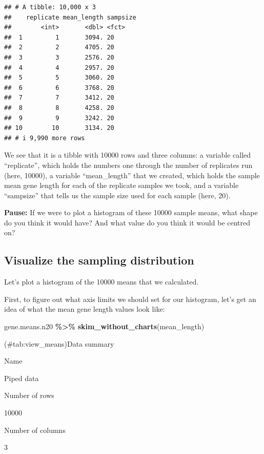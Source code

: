 \documentclass[
]{book}
\newenvironment{Shaded}{\begin{snugshade}}{\end{snugshade}}
\newcommand{\FunctionTok}[1]{\textcolor[rgb]{0.13,0.29,0.53}{\textbf{#1}}}
\newcommand{\NormalTok}[1]{#1}
\newcommand{\SpecialCharTok}[1]{\textcolor[rgb]{0.81,0.36,0.00}{\textbf{#1}}}
\begin{document}
\begin{verbatim}
## # A tibble: 10,000 x 3
##    replicate mean_length sampsize
##        <int>       <dbl> <fct>   
##  1         1       3094. 20      
##  2         2       4705. 20      
##  3         3       2576. 20      
##  4         4       2957. 20      
##  5         5       3060. 20      
##  6         6       3768. 20      
##  7         7       3412. 20      
##  8         8       4258. 20      
##  9         9       3242. 20      
## 10        10       3134. 20      
## # i 9,990 more rows
\end{verbatim}

We see that it is a tibble with 10000 rows and three columns: a variable called ``replicate'', which holds the numbers one through the number of replicates run (here, 10000), a variable ``mean\_length'' that we created, which holds the sample mean gene length for each of the replicate samples we took, and a variable ``sampsize'' that tells us the sample size used for each sample (here, 20).

\textbf{Pause:}
If we were to plot a histogram of these 10000 sample means, what shape do you think it would have? And what value do you think it would be centred on?

\subsection{Visualize the sampling distribution}\label{hist_samdist}

Let's plot a histogram of the 10000 means that we calculated.

First, to figure out what axis limits we should set for our histogram, let's get an idea of what the mean gene length values look like:

\begin{Shaded}
\begin{Highlighting}[]
\NormalTok{gene.means.n20 }\SpecialCharTok{\%\textgreater{}\%}
 \FunctionTok{skim\_without\_charts}\NormalTok{(mean\_length)}
\end{Highlighting}
\end{Shaded}

(\#tab:view\_means)Data summary

Name

Piped data

Number of rows

10000

Number of columns

3
\end{document}
